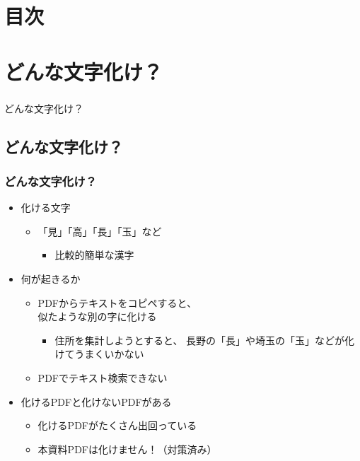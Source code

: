 \section*{目次}
\begin{frame}\frametitle{}\footnotesize\setlength{\columnseprule}{1pt}
  \begin{multicols}{2}%
    \tableofcontents
  \end{multicols}
\end{frame}

\section{どんな文字化け？}
\begin{frame}\frametitle{}
  \centering
  どんな文字化け？
\end{frame}

\subsection{どんな文字化け？}
\begin{frame}\frametitle{どんな文字化け？}
  \begin{itemize}
  \item 化ける文字
    \begin{itemize}
    \item 「見」「高」「長」「玉」など
      \begin{itemize}
      \item 比較的簡単な漢字
      \end{itemize}
    \end{itemize}
  \item 何が起きるか
    \begin{itemize}
    \item PDFからテキストをコピペすると、 \\ 似たような別の字に化ける
      \begin{itemize}
      \item 住所を集計しようとすると、
        長野の「長」や埼玉の「玉」などが化けてうまくいかない
      \end{itemize}
    \item PDFでテキスト検索できない
    \end{itemize}
  \item 化けるPDFと化けないPDFがある
    \begin{itemize}
    \item 化けるPDFがたくさん出回っている
    \item 本資料PDFは化けません！（対策済み）
    \end{itemize}
  \end{itemize}
\end{frame}

